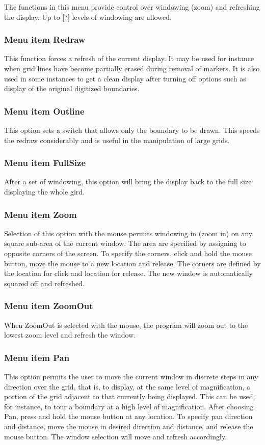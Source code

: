 \documentclass{article}
\begin{document}
The functions in this menu provide control over windowing (zoom) and refreshing the display. Up to [?] levels of windowing are allowed.

\subsubsection{Menu item Redraw}
This function forces a refresh of the current display. It may be used for instance when grid lines have become partially erased during removal of markers. It is also used in some instances to get a clean display after turning off options such as display of the original digitized boundaries.

\subsubsection{Menu item Outline}
This option sets a switch that allows only the boundary to be drawn. This speeds the redraw considerably and is useful in the manipulation of large grids.

\subsubsection{Menu item FullSize}
After a set of windowing, this option will bring the display back to the full size displaying the whole gird.

\subsubsection{Menu item Zoom}
Selection of this option with the mouse permits windowing in (zoom in) on any square sub-area of the current window. The area are specified by assigning to opposite corners of the screen. To specify the corners, click and hold the mouse button, move the mouse to a new location and release. The corners are defined by the location for click and location for release. The new window is automatically squared off and refreshed.

\subsubsection{Menu item ZoomOut}
When ZoomOut is selected with the mouse, the program will zoom out to the lowest zoom level and refresh the window. 

\subsubsection{Menu item Pan}
This option permits the user to move the current window in discrete steps in any direction over the grid, that is, to display, at the same level of magnification, a portion of the grid adjacent to that currently being displayed. This can be used, for instance, to tour a boundary at a high level of magnification. After choosing Pan, press and hold the mouse button at any location. To specify pan direction and distance, move the mouse in desired direction and distance, and release the mouse button. The window selection will move and refresh accordingly.
\end{document}
